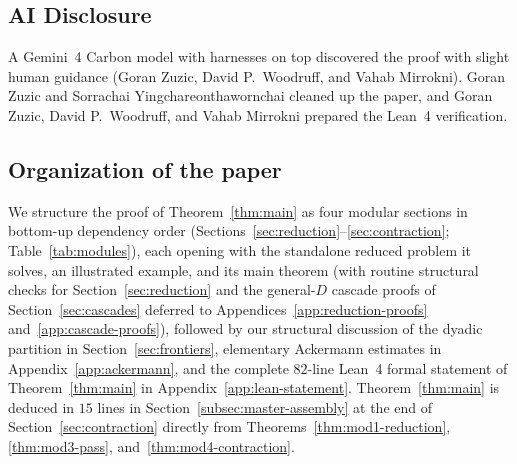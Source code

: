 \documentclass[11pt]{article}
\theoremstyle{definition}
\theoremstyle{remark}
\begin{document}
\subsection{AI Disclosure}
\label{subsec:ai-disclosure}
A Gemini~4 Carbon model with harnesses on top discovered the proof with slight human guidance (Goran Zuzic, David P.~Woodruff, and Vahab Mirrokni). Goran Zuzic and Sorrachai Yingchareonthawornchai cleaned up the paper, and Goran Zuzic, David P.~Woodruff, and Vahab Mirrokni prepared the Lean~4 verification.


\subsection{Organization of the paper}
We structure the proof of Theorem~\ref{thm:main} as four modular sections in bottom-up dependency order (Sections~\ref{sec:reduction}--\ref{sec:contraction}; Table~\ref{tab:modules}), each opening with the standalone reduced problem it solves, an illustrated example, and its main theorem (with routine structural checks for Section~\ref{sec:reduction} and the general-$D$ cascade proofs of Section~\ref{sec:cascades} deferred to Appendices~\ref{app:reduction-proofs} and~\ref{app:cascade-proofs}), followed by our structural discussion of the dyadic partition in Section~\ref{sec:frontiers}, elementary Ackermann estimates in Appendix~\ref{app:ackermann}, and the complete $82$-line Lean~4 formal statement of Theorem~\ref{thm:main} in Appendix~\ref{app:lean-statement}. Theorem~\ref{thm:main} is deduced in $15$ lines in Section~\ref{subsec:master-assembly} at the end of Section~\ref{sec:contraction} directly from Theorems~\ref{thm:mod1-reduction}, \ref{thm:mod3-pass}, and~\ref{thm:mod4-contraction}.
\end{document}
